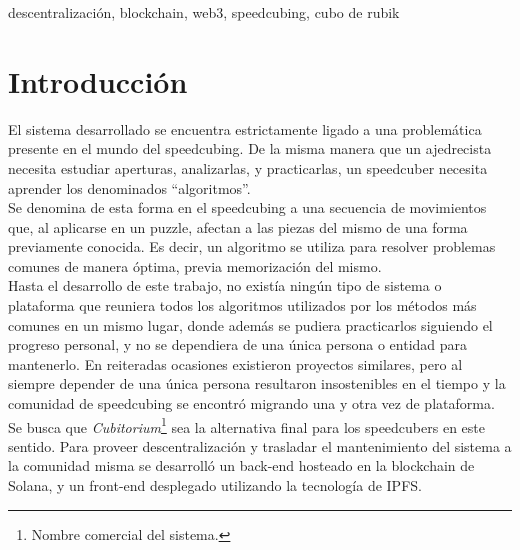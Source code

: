 \begin{multicols}{2}



{\footnotesize
descentralización, blockchain, web3, speedcubing, cubo de rubik
\par}

\section{Introducción}

El sistema desarrollado se encuentra estrictamente ligado a una problemática presente en el mundo del speedcubing. De la misma manera que un ajedrecista necesita estudiar aperturas, analizarlas, y practicarlas, un speedcuber necesita aprender los denominados ``algoritmos''.\\

Se denomina de esta forma en el speedcubing a una secuencia de movimientos que, al aplicarse en un puzzle, afectan a las piezas del mismo de una forma previamente conocida. Es decir, un algoritmo se utiliza para resolver problemas comunes de manera óptima, previa memorización del mismo.\\

Hasta el desarrollo de este trabajo, no existía ningún tipo de sistema o plataforma que reuniera todos los algoritmos utilizados por los métodos más comunes en un mismo lugar, donde además se pudiera practicarlos siguiendo el progreso personal, y no se dependiera de una única persona o entidad para mantenerlo.
En reiteradas ocasiones existieron proyectos similares, pero al siempre depender de una única persona resultaron insostenibles en el tiempo y la comunidad de speedcubing se encontró migrando una y otra vez de plataforma.\\

Se busca que \textit{Cubitorium}\footnote{Nombre comercial del sistema.} sea la alternativa final para los speedcubers en este sentido. Para proveer descentralización y trasladar el mantenimiento del sistema a la comunidad misma se desarrolló un back-end hosteado en la blockchain de Solana\cite{solana}, y un front-end desplegado utilizando la tecnología de IPFS\cite{ipfs}.\\


\end{multicols}
